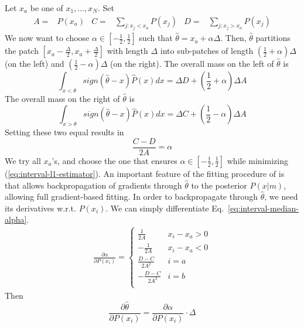 Let $x_a$ be one of $x_1, \dots, x_N$.
Set
\begin{align*}
    A =& P(x_a) &
    C =& \sum_{j : x_j < x_a} P(x_j)&
    D =& \sum_{j : x_j>x_a} P(x_j)
\end{align*}
We now want to choose $\alpha \in [-\frac{1}{2},\frac{1}{2}]$ such that $\widehat{\theta} = x_a + \alpha\Delta$.
Then, $\widehat{\theta}$ partitions the patch $[x_a-\frac{\Delta}{2}, x_a+\frac{\Delta}{2}]$ with length $\Delta$ into sub-patches of length $(\frac{1}{2}+\alpha) \Delta$ (on the left) and $(\frac{1}{2}-\alpha) \Delta$ (on the right).
The overall mass on the left of $\widehat{\theta}$ is
\begin{equation}
  \int_{x<\theta} sign(\widehat{\theta}-x) \widehat{P}(x) dx  =  \Delta D + \left(\frac{1}{2}+\alpha\right) \Delta A %
\end{equation}
The overall mass on the right of $\widehat{\theta}$ is
\begin{equation}
  \int_{x>\theta} sign(\widehat{\theta}-x) \widehat{P}(x) dx =   \Delta C + \left(\frac{1}{2}-\alpha\right) \Delta A %
\end{equation}
Setting these two equal results in
\begin{equation}\label{eq:interval-median-alpha}
    \frac{C-D}{2A} =   \alpha
\end{equation}
We try all $x_a$'s, and choose the one that ensures $\alpha \in [-\frac{1}{2}, \frac{1}{2}]$ while minimizing (\ref{eq:interval-l1-estimator}). 
An important feature of the fitting procedure of \citet{hahn2024unifying} is that allows backpropagation of gradients through $\widehat{\theta}$ to the posterior $P(x|m)$, allowing full gradient-based fitting.
In order to backpropagate through $\widehat{\theta}$, we need its derivatives w.r.t. $P(x_i)$.
We can simply differentiate Eq.~\ref{eq:interval-median-alpha}.
\begin{align*}
    \frac{\partial \alpha}{\partial P(x_i)} = \begin{cases}
        \frac{1}{2A} & x_i-x_a > 0 \\
        -\frac{1}{2A} & x_i-x_a < 0 \\
      \frac{D-C}{2A^2}  & i=a \\
        -\frac{D-C}{2A^2} & i=b \\
    \end{cases}
\end{align*}
Then
\begin{equation}
    \frac{\partial \widehat{\theta}}{\partial P(x_i)} = \frac{\partial \alpha}{\partial P(x_i)} \cdot \Delta
\end{equation}




